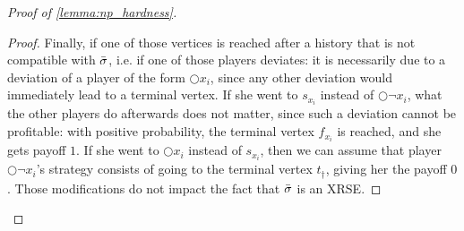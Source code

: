 \begin{proof}[Proof of \cref{lemma:np_hardness}]
\begin{proof}
    Finally, if one of those vertices is reached after a history that is not compatible with ${\bar{\sigma}}$, i.e. if one of those players deviates: it is necessarily due to a deviation of a player of the form $\Circle x_i$, since any other deviation would immediately lead to a terminal vertex.
    If she went to $s_{x_i}$ instead of $\Circle \neg x_i$, what the other players do afterwards does not matter, since such a deviation cannot be profitable: with positive probability, the terminal vertex $f_{x_i}$ is reached, and she gets payoff $1$.
    If she went to $\Circle x_i$ instead of $s_{x_i}$, then we can assume that player $\Circle \neg x_i$'s strategy consists of going to the terminal vertex $t_\dag$, giving her the payoff $0$.
    Those modifications do not impact the fact that ${\bar{\sigma}}$ is an XRSE.
\end{proof}

    

\end{proof}
